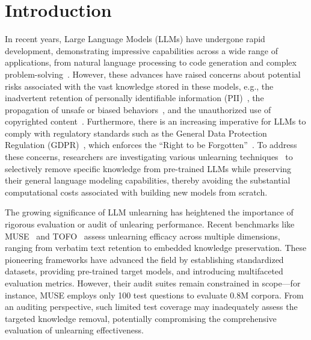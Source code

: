 \section{Introduction}
\label{sec:intro}

In recent years, Large Language Models (LLMs) have undergone rapid development, demonstrating impressive capabilities across a wide range of applications, from natural language processing to code generation and complex problem-solving~\cite{liu2023codegeneratedchatgptreally, satpute2024can}.
However, these advances have raised concerns about potential risks associated with the vast knowledge stored in these models, e.g., the inadvertent retention of personally identifiable information (PII)~\cite{jang2022knowledge}, the propagation of unsafe or biased behaviors~\cite{liu2024saferlargelanguagemodels}, and the unauthorized use of copyrighted content~\cite{eldan2023s}.
Furthermore, there is an increasing imperative for LLMs to comply with regulatory standards such as the General Data Protection Regulation (GDPR)~\cite{hoofnagle2019european}, which enforces the ``Right to be Forgotten''~\cite{dang2021right}.
To address these concerns, researchers are investigating various unlearning techniques~\cite{jia2024soul} to selectively remove specific knowledge from pre-trained LLMs while preserving their general language modeling capabilities, thereby avoiding the substantial computational costs associated with building new models from scratch.





% 

The growing significance of LLM unlearning has heightened the importance of rigorous evaluation or audit of unlearing performance. Recent benchmarks like MUSE~\cite{shi2024muse} and TOFO~\cite{maini2024tofu} assess unlearning efficacy across multiple dimensions, ranging from verbatim text retention to embedded knowledge preservation. 
These pioneering frameworks have advanced the field by establishing standardized datasets, providing pre-trained target models, and introducing multifaceted evaluation metrics. However, their audit suites remain constrained in scope—for instance, MUSE employs only 100 test questions to evaluate 0.8M corpora. From an auditing perspective, such limited test coverage may inadequately assess the targeted knowledge removal, potentially compromising the comprehensive evaluation of unlearning effectiveness.

